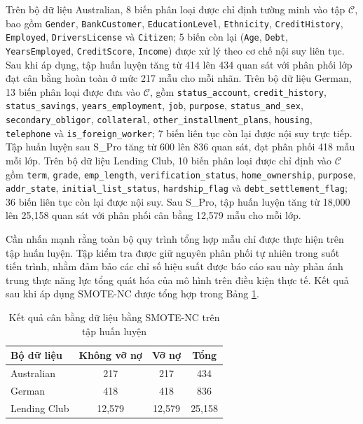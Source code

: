 Trên bộ dữ liệu Australian, 8 biến phân loại được chỉ định tường minh vào tập $\mathcal{C}$, bao gồm \texttt{Gender}, \texttt{BankCustomer}, \texttt{EducationLevel}, \texttt{Ethnicity}, \texttt{CreditHistory}, \texttt{Employed}, \texttt{DriversLicense} và \texttt{Citizen}; 5 biến còn lại (\texttt{Age}, \texttt{Debt}, \texttt{YearsEmployed}, \texttt{CreditScore}, \texttt{Income}) được xử lý theo cơ chế nội suy liên tục. Sau khi áp dụng, tập huấn luyện tăng từ 414 lên 434 quan sát với phân phối lớp đạt cân bằng hoàn toàn ở mức 217 mẫu cho mỗi nhãn. Trên bộ dữ liệu German, 13 biến phân loại được đưa vào $\mathcal{C}$, gồm \texttt{status\_account}, \texttt{credit\_history}, \texttt{status\_savings}, \texttt{years\_employment}, \texttt{job}, \texttt{purpose}, \texttt{status\_and\_sex}, \texttt{secondary\_obligor}, \texttt{collateral}, \texttt{other\_installment\_plans}, \texttt{housing}, \texttt{telephone} và \texttt{is\_foreign\_worker}; 7 biến liên tục còn lại được nội suy trực tiếp. Tập huấn luyện sau S\_Pro tăng từ 600 lên 836 quan sát, đạt phân phối 418 mẫu mỗi lớp. Trên bộ dữ liệu Lending Club, 10 biến phân loại được chỉ định vào $\mathcal{C}$ gồm \texttt{term}, \texttt{grade}, \texttt{emp\_length}, \texttt{verification\_status}, \texttt{home\_ownership}, \texttt{purpose}, \texttt{addr\_state}, \texttt{initial\_list\_status}, \texttt{hardship\_flag} và \texttt{debt\_settlement\_flag}; 36 biến liên tục còn lại được nội suy. Sau S\_Pro, tập huấn luyện tăng từ 18,000 lên 25,158 quan sát với phân phối cân bằng 12,579 mẫu cho mỗi lớp.

Cần nhấn mạnh rằng toàn bộ quy trình tổng hợp mẫu chỉ được thực hiện trên tập huấn luyện. Tập kiểm tra được giữ nguyên phân phối tự nhiên trong suốt tiến trình, nhằm đảm bảo các chỉ số hiệu suất được báo cáo sau này phản ánh trung thực năng lực tổng quát hóa của mô hình trên điều kiện thực tế. Kết quả sau khi áp dụng SMOTE-NC được tổng hợp trong Bảng \ref{tab:smote_results}.

\begin{table}[H]
    \centering
    \caption{Kết quả cân bằng dữ liệu bằng SMOTE-NC trên tập huấn luyện}
    \label{tab:smote_results}
    \renewcommand{\arraystretch}{1.3} %
    \begin{tabular}{|l|c|c|c|}
        \hline
        \textbf{Bộ dữ liệu} & \textbf{Không vỡ nợ} & \textbf{Vỡ nợ} & \textbf{Tổng} \\ \hline
        Australian & 217 & 217 & 434 \\ \hline
        German & 418 & 418 & 836 \\ \hline
        Lending Club & 12,579 & 12,579 & 25,158 \\ \hline
    \end{tabular}
\end{table}

